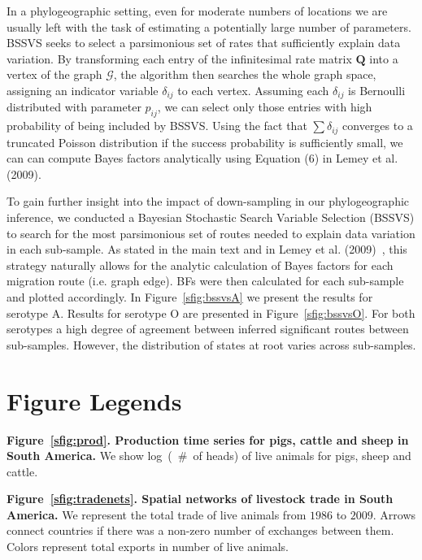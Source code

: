 \documentclass[a4paper,10pt]{article}
\begin{document}
In a phylogeographic setting, even for moderate numbers of locations we are usually left with the task of estimating a potentially large number of parameters. 
BSSVS seeks to select a parsimonious set of rates that sufficiently explain data variation.
By transforming each entry of the infinitesimal rate matrix $\mathbf{Q}$ into a vertex of the graph $\mathcal{G}$, the algorithm then searches the whole graph space, assigning an indicator variable $\delta_{ij}$ to each vertex.
Assuming each $\delta_{ij}$ is Bernoulli distributed with parameter $p_{ij}$, we can select only those entries with high probability of being included by BSSVS.
Using the fact that $\sum\delta_{ij}$ converges to a truncated Poisson distribution if the success probability is sufficiently small, we can can compute Bayes factors analytically using Equation (6) in Lemey et al. (2009).

To gain further insight into the impact of down-sampling in our phylogeographic inference, we conducted a Bayesian Stochastic Search Variable Selection (BSSVS) to search for the most parsimonious set of routes needed to explain data variation in each sub-sample.
As stated in the main text and in Lemey et al. (2009)~\cite{M-roots}, this strategy naturally allows for the analytic calculation of Bayes factors for each migration route (i.e. graph edge).
BFs were then calculated for each sub-sample and plotted accordingly.
In Figure~\ref{sfig:bssvsA} we present the results for serotype A.
Results for serotype O are presented in Figure~\ref{sfig:bssvsO}.
For both serotypes a high degree of agreement between inferred significant routes between sub-samples.
However, the distribution of states at root varies across sub-samples.



\section*{Figure Legends}

\textbf{Figure~\ref{sfig:prod}. Production time series for pigs, cattle and sheep in South America.}
We show log~(~\#~of heads) of live animals for pigs, sheep and cattle.

\textbf{Figure~\ref{sfig:tradenets}. Spatial networks of livestock trade in South America.}
We represent the total trade of live animals from $1986$ to $2009$.
Arrows connect countries if there was a non-zero number of exchanges between them.
Colors represent total exports in number of live animals.
\end{document}
